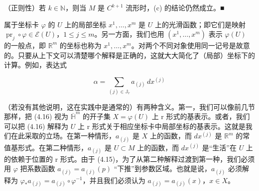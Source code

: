 \begin{remark}
\begin{items}
\item

（正则性）若 $ k\in\mathbb{N} $，则当 $ M $ 是 $ C^{k+1} $ 流形时，(c) 的结论仍然成立。\nobreak\hspace{0.35em}■

\end{items}

属于坐标卡 $ \varphi $ 的 $ U $ 上的局部坐标 $ x^{1},\ldots,x^{m} $ 是 $ U $ 上的光滑函数；即它们是映射 $ \operatorname{pr}_{j}\circ\varphi\in\mathcal{E}(U) $，$ 1\le j\le m $。另一方面，我们也用 $ (x^{1},\ldots,x^{m}) $ 表示 $ \varphi(U) $ 的一般点，即 $ \mathbb{R}^{m} $ 的坐标也称为 $ x^{1},\ldots,x^{m} $。对两个不同对象使用同一记号是故意的。只要从上下文可以清楚哪个解释是正确的，这就大大简化了（局部）坐标下的计算。例如，表达式

\begin{equation}
\alpha = \sum_{(j)\in\mathbb{J}_{r}}a_{(j)}\,dx^{(j)}\tag{4.16}
\end{equation}

（若没有其他说明，这在实践中是通常的）有两种含义。第一，我们可以像前几节那样，把 (4.16) 视为 $ \overline{\mathbb{H}}^{m} $ 的开子集 $ X = \varphi(U) $ 上 r 形式的基表示。或者，我们可以把 (4.16) 解释为 $ U $ 上 r 形式关于相应坐标卡中局部坐标的基表示。这就是我们在此采取的立场。在第一种情形，$ a_{(j)} $ 是 $ X $ 上的函数，而 $ dx^{(j)} $ 是 $ \mathbb{R}^{m} $ 的常值基形式。在第二种情形，$ a_{(j)} $ 是 $ U\subset M $ 上的函数，而 $ dx^{(j)} $ 是“生活”在 $ U $ 上的依赖于位置的 r 形式。由于 (4.15)，为了从第二种解释过渡到第一种，我们必须用 $ \varphi $ 把系数函数 $ a_{(j)} = a_{(j)}(p) $ “下推”到参数区域。也就是说，$ a_{(j)} $ 必须解释为 $ \varphi_{\ast}a_{(j)} = a_{(j)}\circ\varphi^{-1} $，并且我们必须认为 $ a_{(j)} = a_{(j)}(x) $，$ x\in X $。

\end{remark}


